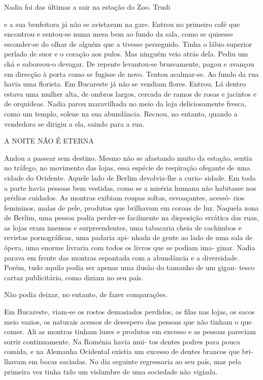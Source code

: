 Nadia foi das últimas a sair na estação do Zoo. Trudi

e a sua benfeitora já não se avistavam na gare. Entrou no primeiro café
que encontrou e sentou‑se numa mesa bem ao fundo da sala, como se
quisesse esconder‑se do olhar de alguém que a tivesse perseguido. Tinha
o lábio superior perlado de suor e o coração aos pulos. Mas ninguém veio
atrás dela. Pediu um chá e saboreou‑o devagar. De repente levantou‑se
bruscamente, pagou e avançou em direcção à porta como se fugisse de
novo. Tentou acalmar‑se. Ao fundo da rua havia uma florista. Em
Bucareste já não se vendiam flores. Entrou. Lá dentro estava uma mulher
alta, de ombros largos, cercada de ramos de rosas e jacintos e de
orquídeas. Nadia parou maravilhada no meio da loja deliciosamente
fresca, como um templo, solene na sua abundância. Recuou, no entanto,
quando a vendedora se dirigiu a ela, saindo para a rua.

A NOITE NÃO É ETERNA

Andou a passear sem destino. Mesmo não se afastando muito da estação,
sentia no tráfego, no movimento das lojas, essa espécie de respiração
ofegante de uma cidade do Ocidente. Aquele lado de Berlim devolvia‑lhe a
curio‑ sidade. Em toda a parte havia pessoas bem vestidas, como se a
miséria humana não habitasse nos prédios cuidados. As montras exibiam
roupas soltas, esvoaçantes, acessó‑ rios femininos, malas de pele,
produtos que brilhavam em coroas de luz. Naquela zona de Berlim, uma
pessoa podia perder‑se facilmente na disposição errática das ruas, as
lojas eram imensas e surpreendentes, uma tabacaria cheia de cachimbos e
revistas pornográficas, uma padaria api‑ nhada de gente ao lado de uma
sala de ópera, uma enorme livraria com todos os livros que se podiam
ima‑ ginar. Nadia parava em frente das montras espantada com a
abundância e a diversidade. Porém, tudo aquilo podia ser apenas uma
ilusão do tamanho de um gigan‑ tesco cartaz publicitário, como diziam no
seu país.

Não podia deixar, no entanto, de fazer comparações.

Em Bucareste, viam‑se os rostos demasiados perdidos, as filas nas lojas,
os sacos meio vazios, os naturais acessos de desespero das pessoas que
não tinham o que comer. Ali as montras tinham luzes e produtos em
excesso e as pessoas pareciam sorrir continuamente. Na Roménia havia
mui‑ tos dentes podres para pouca comida, e na Alemanha Ocidental
existia um excesso de dentes brancos que bri‑ lhavam em bocas saciadas.
No dia seguinte regressaria ao seu país, mas pela primeira vez tinha
tido um vislumbre de uma sociedade não vigiada.


